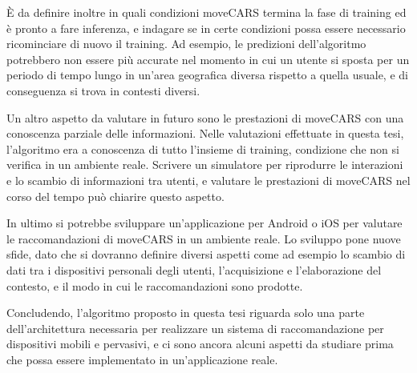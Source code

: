 \documentclass[12pt,italian]{report}
\begin{document}
 \`E da definire inoltre in quali condizioni moveCARS termina la fase di training ed è pronto a fare inferenza, e indagare se in certe condizioni possa essere necessario ricominciare di nuovo il training. Ad esempio, le predizioni dell'algoritmo potrebbero non essere più accurate nel momento in cui un utente si sposta per un periodo di tempo lungo in un'area geografica diversa rispetto a quella usuale, e di conseguenza si trova in contesti diversi.

Un altro aspetto da valutare in futuro sono le prestazioni di moveCARS con una conoscenza parziale delle informazioni. Nelle valutazioni effettuate in questa tesi, l'algoritmo era a conoscenza di tutto l'insieme di training, condizione che non si verifica in un ambiente reale. Scrivere un simulatore per riprodurre le interazioni e lo scambio di informazioni tra utenti, e valutare le prestazioni di moveCARS nel corso del tempo può chiarire questo aspetto.

In ultimo si potrebbe sviluppare un'applicazione per Android o iOS per valutare le raccomandazioni di moveCARS in un ambiente reale. Lo sviluppo pone nuove sfide, dato che si dovranno definire diversi aspetti come ad esempio lo scambio di dati tra i dispositivi personali degli utenti, l'acquisizione e l'elaborazione del contesto, e il modo in cui le raccomandazioni sono prodotte.

Concludendo, l'algoritmo proposto in questa tesi riguarda solo una parte dell'architettura necessaria per realizzare un sistema di raccomandazione per dispositivi mobili e pervasivi, e ci sono ancora alcuni aspetti da studiare prima che possa essere implementato in un'applicazione reale.

%
%



\end{document}
